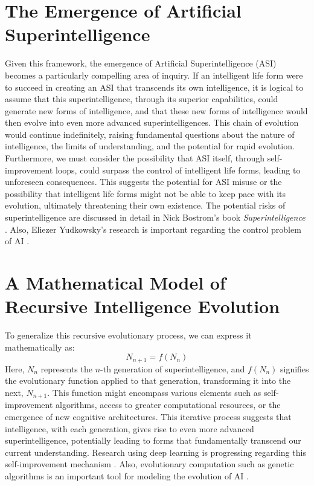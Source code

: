 \documentclass[12pt]{article}
\begin{document}
\section{The Emergence of Artificial Superintelligence}
Given this framework, the emergence of Artificial Superintelligence (ASI) becomes a particularly compelling area of inquiry. If an intelligent life form were to succeed in creating an ASI that transcends its own intelligence, it is logical to assume that this superintelligence, through its superior capabilities, could generate new forms of intelligence, and that these new forms of intelligence would then evolve into even more advanced superintelligences. This chain of evolution would continue indefinitely, raising fundamental questions about the nature of intelligence, the limits of understanding, and the potential for rapid evolution. Furthermore, we must consider the possibility that ASI itself, through self-improvement loops, could surpass the control of intelligent life forms, leading to unforeseen consequences. This suggests the potential for ASI misuse or the possibility that intelligent life forms might not be able to keep pace with its evolution, ultimately threatening their own existence. The potential risks of superintelligence are discussed in detail in Nick Bostrom's book \textit{Superintelligence} \cite{bostrom2014}. Also, Eliezer Yudkowsky's research is important regarding the control problem of AI \cite{yudkowsky2008}.

\section{A Mathematical Model of Recursive Intelligence Evolution}
To generalize this recursive evolutionary process, we can express it mathematically as:
\begin{equation}
N_{n+1} = f(N_n)
\end{equation}
Here, $N_{n}$ represents the $n$-th generation of superintelligence, and $f(N_n)$ signifies the evolutionary function applied to that generation, transforming it into the next, $N_{n+1}$. This function might encompass various elements such as self-improvement algorithms, access to greater computational resources, or the emergence of new cognitive architectures. This iterative process suggests that intelligence, with each generation, gives rise to even more advanced superintelligence, potentially leading to forms that fundamentally transcend our current understanding. Research using deep learning is progressing regarding this self-improvement mechanism \cite{schmidhuber2015}. Also, evolutionary computation such as genetic algorithms is an important tool for modeling the evolution of AI \cite{holland1992}.
\end{document}
